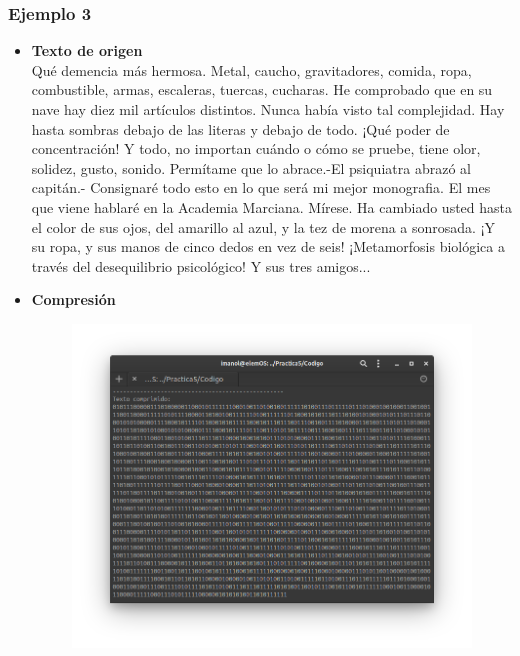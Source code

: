     \subsubsection{Ejemplo 3}
        \begin{itemize}
            \item \textbf{Texto de origen} \\
            Qué demencia más hermosa. Metal, caucho, gravitadores, comida, ropa,
combustible, armas, escaleras, tuercas, cucharas. He comprobado que en su nave
hay diez mil artículos distintos. Nunca había visto tal complejidad. Hay hasta
sombras debajo de las literas y debajo de todo. ¡Qué poder de concentración! Y
todo, no importan cuándo o cómo se pruebe, tiene olor, solidez, gusto, sonido.
Permítame que lo abrace.-El psiquiatra abrazó al capitán.- Consignaré todo esto
en lo que será mi mejor monografia. El mes que viene hablaré en la Academia
Marciana. Mírese. Ha cambiado usted hasta el color de sus ojos, del amarillo al
azul, y la tez de morena a sonrosada. ¡Y su ropa, y sus manos de cinco dedos en
vez de seis! ¡Metamorfosis biológica a través del desequilibrio psicológico! Y sus
tres amigos... 
            \item \textbf{Compresión} \\
                \begin{figure}[h!]
                    \centering
                    \includegraphics[width=17cm]{Huffman/ejemplos/ejemplo3/ej3-comp.png}
                \end{figure}
                \newpage

\end{itemize}
